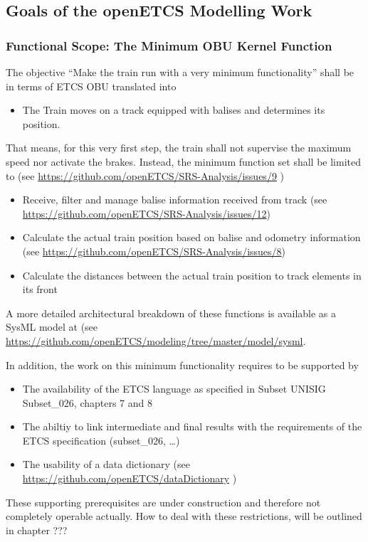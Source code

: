 \subsection{Goals of the openETCS Modelling Work}


\subsubsection{Functional Scope: The Minimum OBU Kernel Function}
\label{sec:FunctionalScopeTheMinimumOBUKernelFunction}

The objective ``Make the train run with a very minimum functionality'' shall be in terms of ETCS OBU translated into 
\begin{itemize}
	\item The Train moves on a track equipped with balises and determines its position.
\end{itemize}
That means, for this very first step, the train shall not supervise the maximum speed nor activate the brakes. Instead, the minimum function set shall be limited to (see \url{https://github.com/openETCS/SRS-Analysis/issues/9} ) 
\begin{itemize}
	\item Receive, filter and manage balise information received from track (see \url{https://github.com/openETCS/SRS-Analysis/issues/12})
	\item Calculate the actual train position based on balise and odometry information (see \url{https://github.com/openETCS/SRS-Analysis/issues/8})
	\item Calculate the distances between the actual train position to track elements in its front
\end{itemize}
A more detailed architectural breakdown of these functions is available as a SysML model at (see \url{https://github.com/openETCS/modeling/tree/master/model/sysml}. 

In addition, the work on this minimum functionality requires to be supported by
\begin{itemize}
	\item The availability of the ETCS language as specified in Subset UNISIG Subset\_026, chapters 7 and 8
	\item The abiltiy to link intermediate and final results with the requirements of the ETCS specification (subset\_026, \dots) 
	\item The usability of a data dictionary (see \url{https://github.com/openETCS/dataDictionary} )
\end{itemize}
These supporting prerequisites are under construction and therefore not completely operable actually. How to deal with these restrictions, will be outlined in chapter ???

